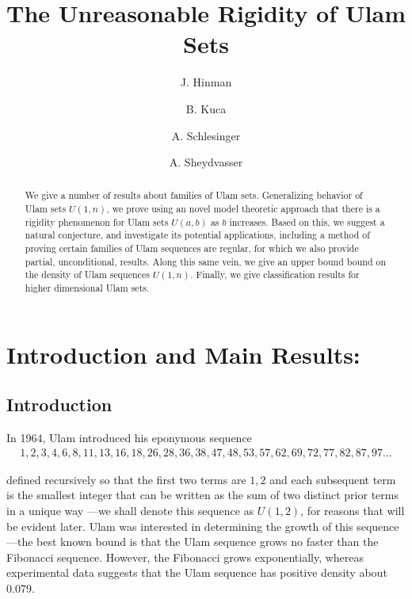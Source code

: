 \documentclass{amsart}
\theoremstyle{theorem}
\theoremstyle{definition}
\begin{document}
\title{The Unreasonable Rigidity of Ulam Sets}

\author{J. Hinman}
\author{B. Kuca}
\author{A. Schlesinger}
\author{A. Sheydvasser}

\address{Department of Mathematics, Yale University, 10 Hillhouse Avenue, New Haven, CT 06511}


\maketitle

\begin{abstract}
We give a number of results about families of Ulam sets. Generalizing behavior of Ulam sets $U(1,n)$, we prove using an novel model theoretic approach that there is a rigidity phenomenon for Ulam sets $U(a,b)$ as $b$ increases. Based on this, we suggest a natural conjecture, and investigate its potential applications, including a method of proving certain families of Ulam sequences are regular, for which we also provide partial, unconditional, results. Along this same vein, we give an upper bound bound on the density of Ulam sequences $U(1,n)$. Finally, we give classification results for higher dimensional Ulam sets.
\end{abstract}

\section{Introduction and Main Results:}\label{Summary}

\subsection{Introduction}
In 1964, Ulam introduced his eponymous sequence
	\begin{align*}
    1, 2, 3, 4, 6, 8, 11, 13, 16, 18, 26, 28, 36, 38, 47, 48, 53, 57, 62, 69, 72, 77, 82, 87, 97 \ldots
    \end{align*}
    
\noindent defined recursively so that the first two terms are $1,2$ and each  subsequent term is the smallest integer that can be written as the sum of two distinct prior terms in a unique way \cite{ulam_1964}---we shall denote this sequence as $U(1,2)$, for reasons that will be evident later. Ulam was interested in determining the growth of this sequence---the best known bound is that the Ulam sequence grows no faster than the Fibonacci sequence. However, the Fibonacci grows exponentially, whereas experimental data suggests that the Ulam sequence has positive density about 0.079.
 
\end{document}
